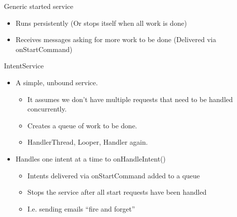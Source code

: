 \documentclass{article}
\begin{document}
\begin{flushleft}
Generic	started	service
\begin{itemize}
  \item Runs persistently (Or stops itself when all work is done)
  \item Receives messages asking for more work to be done (Delivered via onStartCommand)
\end{itemize}
IntentService
\begin{itemize}
  \item A simple, unbound service.
  \begin{itemize}
    \item It assumes we don’t have multiple requests that need to be handled concurrently.
    \item Creates a queue of work to be done.
    \item HandlerThread, Looper, Handler again. 
  \end{itemize}
  \item Handles one intent at a time to onHandleIntent()
  \begin{itemize}
    \item Intents delivered via onStartCommand added to a queue
    \item Stops the service after all start requests have been handled
    \item I.e. sending emails “fire and forget”
  \end{itemize}
\end{itemize}
\end{flushleft}
\end{document}
